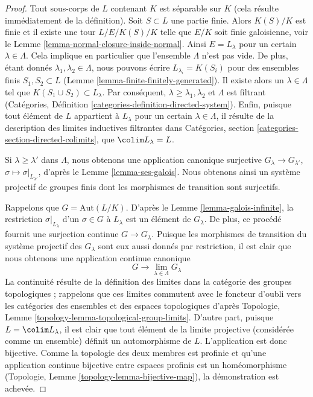 \begin{proof}
Tout sous-corps de $L$ contenant $K$ est séparable sur $K$
(cela résulte immédiatement de la définition). Soit $S \subset L$
une partie finie. Alors $K(S)/K$ est finie et il existe
une tour $L/E/K(S)/K$ telle que $E/K$ soit finie galoisienne, voir le
Lemme \ref{lemma-normal-closure-inside-normal}.
Ainsi $E = L_\lambda$ pour un certain $\lambda \in \Lambda$.
Cela implique en particulier que l'ensemble $\Lambda$ n'est pas vide.
De plus, étant donnés $\lambda_1, \lambda_2 \in \Lambda$, nous pouvons
écrire $L_{\lambda_i} = K(S_i)$ pour des ensembles finis
$S_1, S_2 \subset L$ (Lemme \ref{lemma-finite-finitely-generated}).
Il existe alors un $\lambda \in \Lambda$ tel que
$K(S_1 \cup S_2) \subset L_\lambda$. Par conséquent,
$\lambda \geq \lambda_1, \lambda_2$ et
$\Lambda$ est filtrant (Catégories, Définition
\ref{categories-definition-directed-system}).
Enfin, puisque tout élément de $L$ appartient à
$L_\lambda$ pour un certain $\lambda \in \Lambda$, il résulte
de la description des limites inductives filtrantes dans
Catégories, section \ref{categories-section-directed-colimits},
que $\colim L_\lambda = L$.

\medskip\noindent
Si $\lambda \geq \lambda'$ dans $\Lambda$, nous obtenons une
application canonique surjective $G_\lambda \to G_{\lambda'}$,
$\sigma \mapsto \sigma|_{L_{\lambda'}}$,
d'après le Lemme \ref{lemma-ses-galois}. Nous obtenons ainsi un système
projectif de groupes finis dont les morphismes de transition sont surjectifs.

\medskip\noindent
Rappelons que $G = \text{Aut}(L/K)$. D'après le Lemme \ref{lemma-galois-infinite},
la restriction $\sigma|_{L_\lambda}$ d'un $\sigma \in G$ à $L_\lambda$
est un élément de $G_\lambda$. De plus, ce procédé fournit une surjection
continue $G \to G_\lambda$. Puisque les morphismes de transition
du système projectif des $G_\lambda$ sont eux aussi donnés par restriction,
il est clair que nous obtenons une application continue canonique
$$
G \longrightarrow \lim_{\lambda \in \Lambda} G_\lambda
$$
La continuité résulte de la définition des limites dans la catégorie des groupes
topologiques ; rappelons que ces limites commutent avec le foncteur d'oubli
vers les catégories des ensembles et des espaces topologiques d'après
Topologie, Lemme \ref{topology-lemma-topological-group-limits}.
D'autre part, puisque $L = \colim L_\lambda$, il est clair
que tout élément de la limite projective (considérée comme un ensemble) définit un
automorphisme de $L$. L'application est donc bijective. Comme la topologie
des deux membres est profinie et qu'une application continue bijective
entre espaces profinis est un homéomorphisme
(Topologie, Lemme \ref{topology-lemma-bijective-map}), la démonstration est achevée.
\end{proof}

